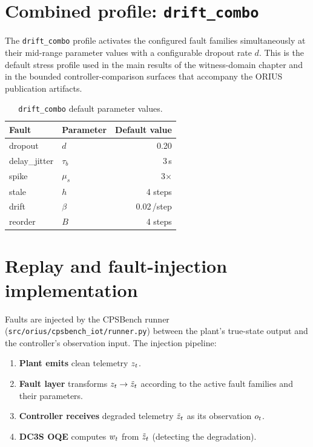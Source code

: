 \section{Combined profile: \texttt{drift\_combo}}

The \texttt{drift\_combo} profile activates the configured fault families
simultaneously at their mid-range parameter values with a configurable
dropout rate $d$.  This is the default stress profile used in the main
results of the witness-domain chapter and in the bounded controller-comparison
surfaces that accompany the ORIUS publication artifacts.

\begin{table}[htbp]
\centering
\caption{\texttt{drift\_combo} default parameter values.}
\label{tab:drift-combo-defaults}
\small
\begin{tabular}{@{}llr@{}}
\toprule
\textbf{Fault} & \textbf{Parameter} & \textbf{Default value} \\
\midrule
dropout        & $d$          & 0.20 \\
delay\_jitter  & $\tau_b$     & 3\,s \\
spike          & $\mu_s$      & 3$\times$ \\
stale          & $h$          & 4 steps \\
drift          & $\beta$      & 0.02\,/step \\
reorder        & $B$          & 4 steps \\
\bottomrule
\end{tabular}
\end{table}

\section{Replay and fault-injection implementation}

Faults are injected by the CPSBench runner
(\texttt{src/orius/cpsbench\_iot/runner.py}) between the plant's
true-state output and the controller's observation input.  The
injection pipeline:

\begin{enumerate}
  \item \textbf{Plant emits} clean telemetry $z_t$.
  \item \textbf{Fault layer} transforms $z_t \to \tilde{z}_t$ according to the
    active fault families and their parameters.
  \item \textbf{Controller receives} degraded telemetry $\tilde{z}_t$ as its
    observation $o_t$.
  \item \textbf{DC3S OQE} computes $w_t$ from $\tilde{z}_t$ (detecting the
    degradation).
\end{enumerate}

